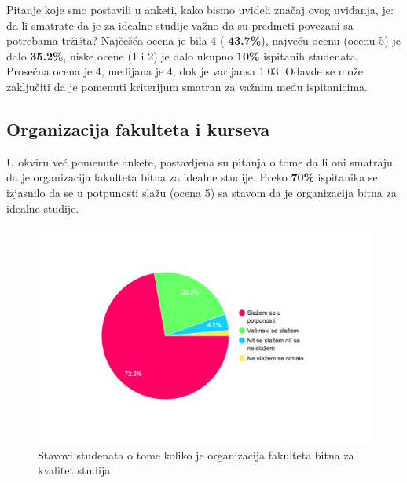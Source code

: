 \documentclass[a4paper]{article}
\begin{document}
{Pitanje koje smo postavili u anketi, kako bismo uvideli značaj ovog uviđanja, je: da li smatrate da je za idealne studije važno da su predmeti povezani sa potrebama tržišta? Najčešća ocena je bila 4 ( \textbf{43.7\%}), najveću ocenu (ocenu 5) je dalo \textbf{35.2\%}, niske ocene (1 i 2) je dalo ukupno \textbf{10\%} ispitanih studenata. Prosečna ocena je 4, medijana je 4, dok je varijansa 1.03. Odavde se može zaključiti da je pomenuti kriterijum smatran za važnim među ispitanicima.


\subsection{Organizacija fakulteta i kurseva}
\label{subsec:organizacija_stavovi}

U okviru već pomenute ankete, postavljena su pitanja o tome da li oni smatraju da je organizacija fakulteta bitna za idealne studije. Preko \textbf{70\%} ispitanika se izjasnilo da se u potpunosti slažu (ocena 5) sa stavom da je organizacija bitna za idealne studije.
\begin{figure}[h!]
\begin{center}
    \includegraphics[width=0.7\linewidth]{Slike/PieChartOrganizacijaFakulteta.png}
    \caption{Stavovi studenata o tome koliko je organizacija fakulteta bitna za kvalitet studija}
    \label{fig:organizacija}
\end{center}
\end{figure}

}
\end{document}
